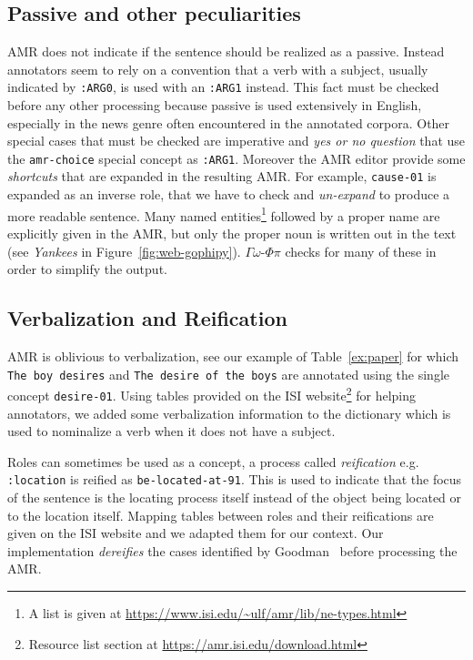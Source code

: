 \documentclass[12pt]{article}
\newcommand{\gophipy}{$\Gamma\omega$-$\Phi\pi$}
\newcommand{\representation}[1]{\textsf{#1}}
\newcommand{\AMR}{\representation{AMR}}
\begin{document}
\subsection{Passive and other peculiarities} %
\label{sub:passive}
\AMR{} does not indicate if the sentence should be realized as a passive. Instead annotators seem to rely on a convention that a verb with a subject, usually indicated by \texttt{:ARG0}, is used with an \texttt{:ARG1} instead. This fact must be checked before any other processing because passive is used extensively in English, especially in the news genre often encountered in the annotated corpora. Other special cases that must be checked are imperative and \emph{yes or no question} that use the \texttt{amr-choice} special concept as \texttt{:ARG1}. Moreover the \AMR{} editor provide some \emph{shortcuts} that are expanded in the resulting \AMR{}. For example, \texttt{cause-01} is expanded as an inverse role, that we have to check and \emph{un-expand} to produce a more readable sentence. Many named entities\footnote{A list is given at \url{https://www.isi.edu/~ulf/amr/lib/ne-types.html}} followed by a proper name are explicitly given in the \AMR{}, but only the proper noun is written out in the text (see \emph{Yankees} in Figure~\ref{fig:web-gophipy}). \gophipy{} checks for many of these in order to simplify the output.

\subsection{Verbalization and Reification} %
\label{sub:verbalization}
\AMR{} is oblivious to verbalization, see our example of Table~\ref{ex:paper} for which \texttt{The boy desires} and \texttt{The desire of the boys} are annotated using the single concept \texttt{desire-01}. Using tables provided on the ISI website\footnote{Resource list section at \url{https://amr.isi.edu/download.html}} for helping annotators, we added some verbalization information to the dictionary which is used to nominalize a verb when it does not have a subject.

Roles can sometimes be used as a concept, a process called \emph{reification} e.g. \texttt{:location} is reified as \texttt{be-located-at-91}. This is used to indicate that the focus of the sentence is the locating process itself instead of the object being located or to the location itself. Mapping tables between roles and their reifications are given on the ISI website and we adapted them for our context. Our implementation \emph{dereifies} the cases identified by Goodman~\cite{Goodman:2019} before processing the \AMR{}.
\end{document}
